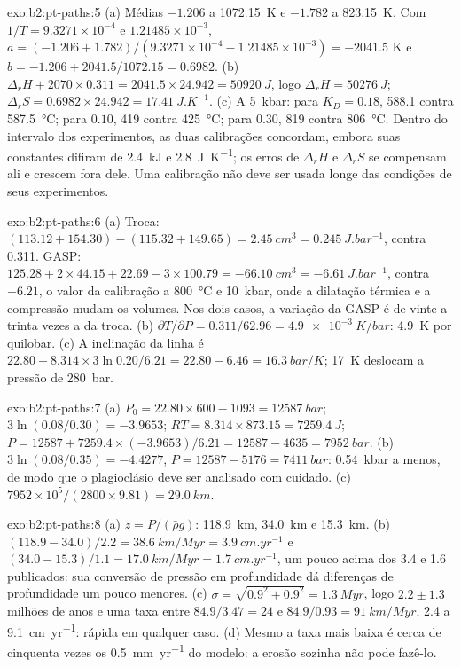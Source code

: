 \begin{solution}{exo:b2:pt-paths:5}
(a) Médias $-1.206$ a \qty{1072.15}{K} e $-1.782$ a \qty{823.15}{K}. Com $1/T =
9.3271\times10^{-4}$ e $1.21485\times10^{-3}$, $a = (-1.206 + 1.782)/(9.3271\times10^{-4}
- 1.21485\times10^{-3}) = -2041.5$ K e $b = -1.206 + 2041.5/1072.15 = 0.6982$.
(b) $\Delta_r H + 2070\times0.311 = 2041.5\times24.942 = \qty{50920}{J}$, logo $\Delta_r H =
\qty{50276}{J}$; $\Delta_r S = 0.6982\times24.942 = \qty{17.41}{J.K^{-1}}$. (c) A
\qty{5}{kbar}: para $K_D = 0.18$, 588.1 contra \qty{587.5}{\celsius}; para $0.10$, 419
contra \qty{425}{\celsius}; para $0.30$, 819 contra \qty{806}{\celsius}. Dentro do intervalo
dos experimentos, as duas calibrações concordam, embora suas constantes difiram de
\qty{2.4}{kJ} e \qty{2.8}{J.K^{-1}}; os erros de $\Delta_r H$ e $\Delta_r S$
se compensam ali e crescem fora dele. Uma calibração não deve ser usada longe
das condições de seus experimentos.
\end{solution}

\begin{solution}{exo:b2:pt-paths:6}
(a) Troca: $(113.12 + 154.30) - (115.32 + 149.65) = \qty{+2.45}{cm^3} =
\qty{0.245}{J.bar^{-1}}$, contra 0.311. GASP: $125.28 + 2\times44.15 + 22.69 -
3\times100.79 = \qty{-66.10}{cm^3} = \qty{-6.61}{J.bar^{-1}}$, contra $-6.21$, o valor
da calibração a \qty{800}{\celsius} e \qty{10}{kbar}, onde a dilatação térmica e a
compressão mudam os volumes. Nos dois casos, a variação da GASP é de vinte a trinta vezes
a da troca. (b) $\partial T/\partial P = 0.311/62.96 = \qty{4.9e-3}{K/bar}$:
\qty{4.9}{K} por quilobar. (c) A inclinação da linha é $22.80 + 8.314\times3\ln 0.20/6.21
= 22.80 - 6.46 = \qty{16.3}{bar/K}$; \qty{17}{K} deslocam a pressão de
\qty{280}{bar}.
\end{solution}

\begin{solution}{exo:b2:pt-paths:7}
(a) $P_0 = 22.80\times600 - 1093 = \qty{12587}{bar}$; $3\ln(0.08/0.30) = -3.9653$; $RT =
8.314\times873.15 = \qty{7259.4}{J}$; $P = 12587 + 7259.4\times(-3.9653)/6.21 = 12587 -
4635 = \qty{7952}{bar}$. (b) $3\ln(0.08/0.35) = -4.4277$, $P = 12587 - 5176 =
\qty{7411}{bar}$: \qty{0.54}{kbar} a menos, de modo que o plagioclásio deve ser analisado com cuidado.
(c) $7952\times10^5/(2800\times9.81) = \qty{29.0}{km}$.
\end{solution}

\begin{solution}{exo:b2:pt-paths:8}
(a) $z = P/(\bar\rho g)$: \qty{118.9}{km}, \qty{34.0}{km} e \qty{15.3}{km}.
(b) $(118.9 - 34.0)/2.2 = \qty{38.6}{km/Myr} = \qty{3.9}{cm.yr^{-1}}$ e $(34.0 -
15.3)/1.1 = \qty{17.0}{km/Myr} = \qty{1.7}{cm.yr^{-1}}$, um pouco acima dos
3.4 e 1.6 publicados: sua conversão de pressão em profundidade dá diferenças de profundidade
um pouco menores. (c) $\sigma = \sqrt{0.9^2 + 0.9^2} = \qty{1.3}{Myr}$, logo $2.2 \pm 1.3$
milhões de anos e uma taxa entre $84.9/3.47 = 24$ e $84.9/0.93 = \qty{91}{km/Myr}$,
2.4 a \qty{9.1}{cm.yr^{-1}}: rápida em qualquer caso. (d) Mesmo a taxa mais baixa é cerca de cinquenta vezes
os \qty{0.5}{mm.yr^{-1}} do modelo: a erosão sozinha não pode fazê-lo.
\end{solution}

